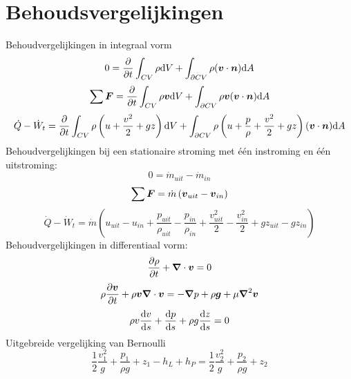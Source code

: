 	\section{Behoudsvergelijkingen}
Behoudvergelijkingen in integraal vorm
\begin{equation}
	0 = \frac{\partial}{\partial t} \int_{CV} \rho \mathrm{d} V + \int_{\partial CV} \rho (\boldsymbol{v}\cdot \boldsymbol{n}) \mathrm{d} A
\end{equation}
\begin{equation}
	\sum \boldsymbol{F} = \frac{\partial}{\partial t} \int_{CV} \rho \boldsymbol{v} \mathrm{d} V + \int_{\partial CV} \rho \boldsymbol{v} (\boldsymbol{v}\cdot \boldsymbol{n}) \mathrm{d} A
\end{equation}
\begin{equation}
	\dot{Q}-\dot{W}_t = \frac{\partial}{\partial t} \int_{CV} \rho \left(u+\frac{v^2}{2}+g z \right) \mathrm{d} V + \int_{\partial CV} \rho \left(u+\frac{p}{\rho}+\frac{v^2}{2}+g z \right) (\boldsymbol{v}\cdot \boldsymbol{n}) \mathrm{d} A
\end{equation}
Behoudvergelijkingen bij een stationaire stroming met één instroming en één uitstroming:
\begin{equation}
	0 = \dot{m}_{uit}-\dot{m}_{in}
\end{equation}
\begin{equation}
	\sum \boldsymbol{F} = \dot{m} \left( \boldsymbol{v}_{uit}-\boldsymbol{v}_{in} \right)
\end{equation}
\begin{equation}
	\dot{Q}-\dot{W}_t = \dot{m} \left(u_{uit}-u_{in}+\frac{p_{uit}}{\rho_{uit}}-\frac{p_{in}}{\rho_{in}}+\frac{v_{uit}^2}{2}-\frac{v_{in}^2}{2}+g z_{uit}-g z_{in} \right)
\end{equation}
Behoudvergelijkingen in differentiaal vorm:
\begin{equation}
	\frac{\partial \rho}{\partial t} + \boldsymbol{\nabla} \cdot \boldsymbol{v} = 0
\end{equation}
\begin{equation}
	\rho \frac{\partial \boldsymbol{v}}{\partial t} + \rho \boldsymbol{v} \boldsymbol{\nabla} \cdot \boldsymbol{v} = -\boldsymbol{\nabla} p + \rho \boldsymbol{g} + \mu \boldsymbol{\nabla}^2 \boldsymbol{v}
\end{equation}
\begin{equation}
	\rho v \frac{\mathrm{d} v}{\mathrm{d} s} + \frac{\mathrm{d} p}{\mathrm{d} s} + \rho g \frac{\mathrm{d} z}{\mathrm{d} s} = 0
\end{equation}
Uitgebreide vergelijking van Bernoulli
\begin{equation}
	\frac{1}{2} \frac{v_1^2}{g} + \frac{p_1}{\rho g} + z_1 - h_L + h_P = \frac{1}{2} \frac{v_2^2}{g} + \frac{p_2}{\rho g} + z_2
\end{equation}

